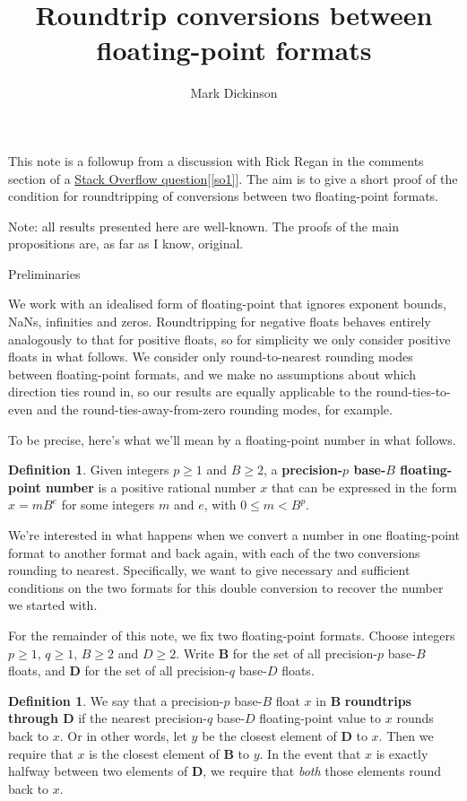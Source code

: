 \documentclass{article}
\title{Roundtrip conversions between floating-point formats}
\author{Mark Dickinson}
\theoremstyle{plain}
\theoremstyle{definition}
\newtheorem{definition}[lemma]{Definition}
\begin{document}
\maketitle

This note is a followup from a discussion with Rick Regan in the comments
section of a \href{http://stackoverflow.com/a/35708911/270986}{Stack Overflow
  question}[\ref{so1}]. The aim is to give a short proof of the condition for
roundtripping of conversions between two floating-point formats.

Note: all results presented here are well-known. The proofs of the main
propositions are, as far as I know, original.

\begin{section}{Preliminaries}

We work with an idealised form of floating-point that ignores exponent bounds,
NaNs, infinities and zeros. Roundtripping for negative floats behaves entirely
analogously to that for positive floats, so for simplicity we only consider
positive floats in what follows.  We consider only round-to-nearest rounding
modes between floating-point formats, and we make no assumptions about which
direction ties round in, so our results are equally applicable to the
round-ties-to-even and the round-ties-away-from-zero rounding modes, for
example.

To be precise, here's what we'll mean by a floating-point number in what
follows.

\begin{definition}
  Given integers $p \ge 1$ and $B \ge 2$, a \textbf{precision-$p$ base-$B$
    floating-point number} is a positive rational number $x$ that can be
  expressed in the form $x = m B^e$ for some integers $m$ and $e$, with $0 \le
  m < B^p$.
\end{definition}

We're interested in what happens when we convert a number in one floating-point
format to another format and back again, with each of the two conversions
rounding to nearest. Specifically, we want to give necessary and sufficient
conditions on the two formats for this double conversion to recover the number
we started with.

For the remainder of this note, we fix two floating-point formats. Choose
integers $p \ge 1$, $q \ge 1$, $B \ge 2$ and $D\ge 2$. Write $\mathbf B$ for
the set of all precision-$p$ base-$B$ floats, and $\mathbf D$ for the set of
all precision-$q$ base-$D$ floats.

\begin{definition}
  We say that a precision-$p$ base-$B$ float $x$ in $\mathbf B$
  \textbf{roundtrips through $\mathbf D$} if the nearest precision-$q$ base-$D$
  floating-point value to $x$ rounds back to $x$. Or in other words, let $y$ be
  the closest element of $\mathbf D$ to $x$. Then we require that $x$ is the
  closest element of $\mathbf B$ to $y$. In the event that $x$ is exactly
  halfway between two elements of $\mathbf D$, we require that \emph{both}
  those elements round back to $x$.


\end{definition}
\end{section}
\end{document}
